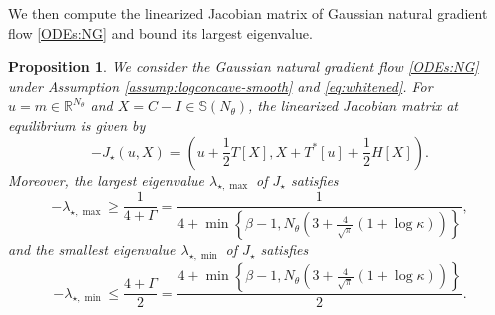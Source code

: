 \documentclass[11pt]{article}
\theoremstyle{plain}
\newtheorem{proposition}[theorem]{Proposition}
\theoremstyle{definition}
\theoremstyle{remark}
\newcommand{\R}{\mathbb{R}}
\newcommand{\Sym}{\mathbb{S}}
\begin{document}
We then compute the linearized Jacobian matrix of Gaussian natural gradient flow \eqref{ODEs:NG} and bound its largest eigenvalue.

\begin{proposition}\label{prop:Jac-eig}
    We consider the Gaussian natural gradient flow \eqref{ODEs:NG} under Assumption \ref{assump:logconcave-smooth} and \eqref{eq:whitened}. For $u = m \in \R^{N_\theta}$ and $X = C - I \in \Sym (N_\theta)$, the linearized Jacobian matrix at equilibrium is given by
    \begin{equation*}
        - J_\star (u, X) = \left( u + \frac{1}{2} T[X], X + T^*[u] + \frac{1}{2} H[X] \right).
    \end{equation*}
    Moreover, the largest eigenvalue $\lambda_{\star, \max}$ of $J_\star$ satisfies
    \begin{equation*}
        -\lambda_{\star, \max} \geq \frac{1}{4 + \Gamma} = \frac{1}{4 + \min \left\{\beta - 1, N_\theta \left(3 + \frac{4}{\sqrt{\pi}} (1 + \log \kappa) \right) \right\}},
    \end{equation*}
    and the smallest eigenvalue $\lambda_{\star, \min}$ of $J_\star$ satisfies
    \begin{equation*}
        -\lambda_{\star, \min} \leq \frac{4 + \Gamma}{2} = \frac{4 + \min \left\{\beta - 1, N_\theta \left(3 + \frac{4}{\sqrt{\pi}} (1 + \log \kappa) \right) \right\}}{2}.
    \end{equation*}
\end{proposition}
\end{document}
